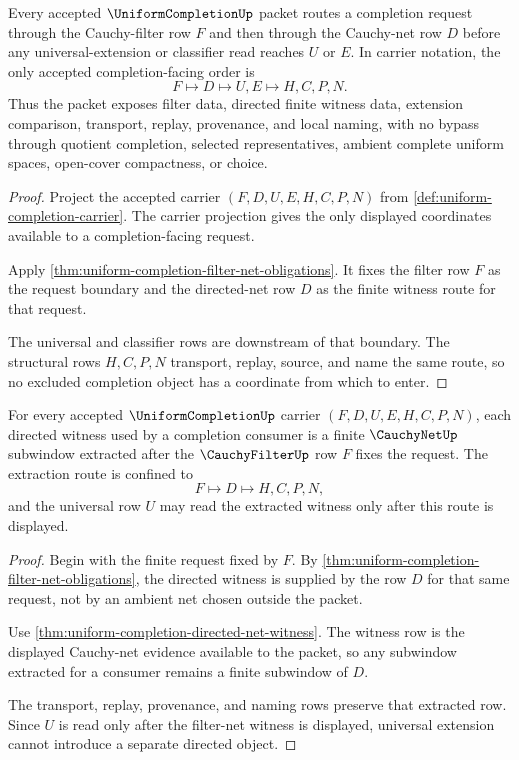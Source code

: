 \begin{theorem}
\label{thm:uniformcompletion-filter-net-exactness}
Every accepted $\UniformCompletionUp$ packet routes a completion request through the Cauchy-filter row $F$ and then through the Cauchy-net row $D$ before any universal-extension or classifier read reaches $U$ or $E$. In carrier notation, the only accepted completion-facing order is
$$
F \longmapsto D \longmapsto U,E \longmapsto H,C,P,N .
$$
Thus the packet exposes filter data, directed finite witness data, extension comparison, transport, replay, provenance, and local naming, with no bypass through quotient completion, selected representatives, ambient complete uniform spaces, open-cover compactness, or choice.
\end{theorem}
\begin{proof}
Project the accepted carrier $(F,D,U,E,H,C,P,N)$ from \autoref{def:uniform-completion-carrier}. The carrier projection gives the only displayed coordinates available to a completion-facing request.

Apply \autoref{thm:uniform-completion-filter-net-obligations}. It fixes the filter row $F$ as the request boundary and the directed-net row $D$ as the finite witness route for that request.

The universal and classifier rows are downstream of that boundary. The structural rows $H,C,P,N$ transport, replay, source, and name the same route, so no excluded completion object has a coordinate from which to enter.
\end{proof}

\begin{theorem}
\label{thm:uniformcompletion-directed-subwindow-extraction}
For every accepted $\UniformCompletionUp$ carrier $(F,D,U,E,H,C,P,N)$, each directed witness used by a completion consumer is a finite $\CauchyNetUp$ subwindow extracted after the $\CauchyFilterUp$ row $F$ fixes the request. The extraction route is confined to
$$
F \longmapsto D \longmapsto H,C,P,N ,
$$
and the universal row $U$ may read the extracted witness only after this route is displayed.
\end{theorem}
\begin{proof}
Begin with the finite request fixed by $F$. By \autoref{thm:uniform-completion-filter-net-obligations}, the directed witness is supplied by the row $D$ for that same request, not by an ambient net chosen outside the packet.

Use \autoref{thm:uniform-completion-directed-net-witness}. The witness row is the displayed Cauchy-net evidence available to the packet, so any subwindow extracted for a consumer remains a finite subwindow of $D$.

The transport, replay, provenance, and naming rows preserve that extracted row. Since $U$ is read only after the filter-net witness is displayed, universal extension cannot introduce a separate directed object.
\end{proof}

